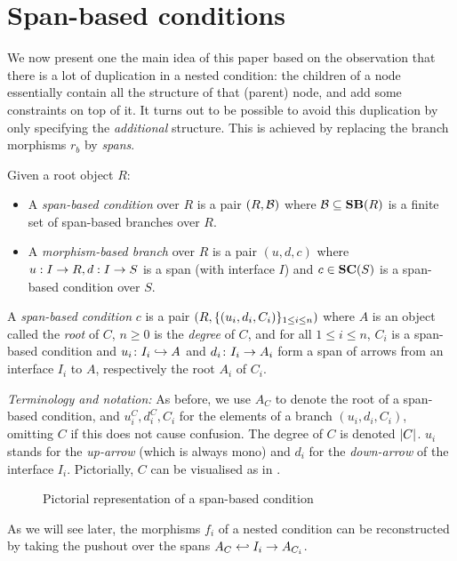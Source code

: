 \section{Span-based conditions}

We now present one the main idea of this paper based on the observation that there is a lot of duplication in a nested condition: the children of a node essentially contain all the structure of that (parent) node, and add some constraints on top of it. It turns out to be possible to avoid this duplication by only specifying the \emph{additional} structure. This is achieved by replacing the branch morphisms $r_b$ by \emph{spans}.


\begin{definition}
  Given a root object $R$:
  \begin{itemize}
  \item A \emph{span-based condition} over $R$ is a pair $(R,\mathcal{B})$ where $\cB\subseteq \SB R$ is a finite set of span-based branches over $R$.
  \item A \emph{morphism-based branch} over $R$ is a pair $(u,d,c)$ where $u:I\rightarrow R,d:I\rightarrow S$ is a span (with interface $I$) and $c\in \SC S$ is a span-based condition over $S$.
  \end{itemize}
\end{definition}
%

\begin{definition}
  A \emph{span-based condition} $c$ is a pair $(R,\{{(u_i,d_i,C_i)}\}_{1\leq i\leq n})$ where $A$ is an object called the \emph{root} of $C$, $n\geq 0$ is the \emph{degree} of $C$, and for all $1\leq i\leq n$, $C_i$ is a span-based condition and $u_i\colon I_i\hookrightarrow A$ and $d_i\colon I_i\rightarrow A_i$ form a span of arrows from an interface $I_i$ to $A$, respectively the root $A_i$ of $C_i$.
\end{definition}
%
\emph{Terminology and notation:} As before, we use $A_C$ to denote the root of a span-based condition, and $u^C_i,d^C_i,C_i$ for the elements of a branch $(u_i,d_i,C_i)$, omitting $C$ if this does not cause confusion. The degree of $C$ is denoted $|{C}|$. $u_i$ stands for the \emph{up-arrow} (which is always mono) and $d_i$ for the \emph{down-arrow} of the interface $I_i$. Pictorially, $C$ can be visualised as in .
%
\begin{figure}
  \centering
  
  \caption{Pictorial representation of a span-based condition}
\end{figure}
%
As we will see later, the morphisms $f_i$ of a nested condition can be reconstructed by taking the pushout over the spans $A_C\hookleftarrow I_i\rightarrow A_{C_i}$.

